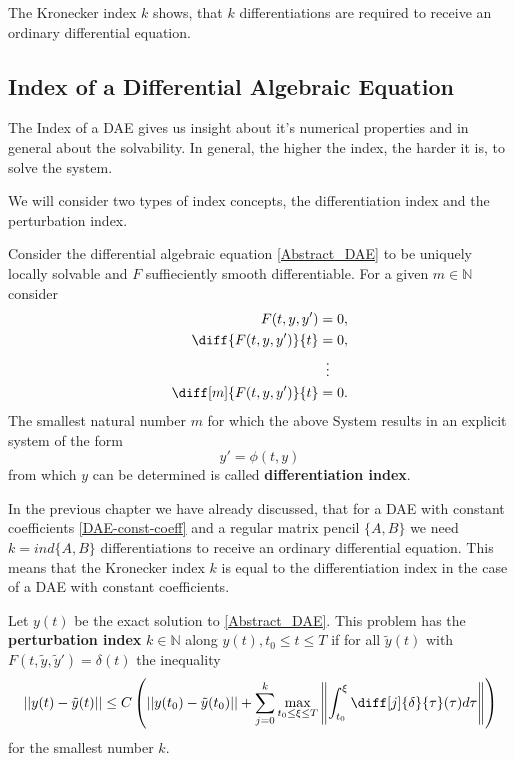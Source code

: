 The Kronecker index $k$ shows, that $k$ differentiations are required to receive an ordinary differential equation.

\subsection{Index of a Differential Algebraic Equation}

The Index of a DAE gives us insight about it's numerical properties and in general about the solvability. In general, the higher the index, the harder it is, to solve the system. 

We will consider two types of index concepts, the differentiation index and the perturbation index.

\begin{definition}
	Consider the differential algebraic equation \ref{Abstract_DAE} to be uniquely locally solvable and $F$ suffieciently smooth differentiable. For a given $m \in \mathbb{N}$ consider
	\begin{displaymath}
		\begin{aligned}
			F(t,y,y') &= 0, \\
			\diff{F(t,y,y')}{t} &= 0, \\
			&\vdotswithin{=} \\
			\diff[m]{F(t,y,y')}{t} &= 0.
		\end{aligned}
	\end{displaymath}
	The smallest natural number $m$ for which the above System results in an explicit system of the form
	\begin{displaymath}
		y' = \phi(t,y)
	\end{displaymath}
	from which $y$ can be determined is called \textbf{differentiation index}.
\end{definition}

In the previous chapter we have already discussed, that for a DAE with constant coefficients \ref{DAE-const-coeff} and a regular matrix pencil $\{A,B\}$  we need $k = ind\{A,B\}$ differentiations to receive an ordinary differential equation. This means that the Kronecker index $k$ is equal to the differentiation index in the case of a DAE with constant coefficients.

\begin{definition}
	Let $y(t)$ be the exact solution to \ref{Abstract_DAE}. This problem has the \textbf{perturbation index} $k \in \mathbb{N}$ along $y(t), t_0 \leq t \leq T$ if for all  $\tilde{y}(t)$ with $F(t, \tilde{y}, \tilde{y}') = \delta(t)$ the inequality
	\begin{displaymath}
		||y(t)-\tilde{y}(t)|| \leq C \left(||y(t_0)-\tilde{y}(t_0)||+\sum_{j=0}^{k}\max_{t_0 \leq \xi \leq T} \left\rVert 		\int_{t_0}^{\xi}\diff[j]{\delta}{\tau}(\tau)d \tau \right\rVert \right)
	\end{displaymath}
	for the smallest number $k$.
\end{definition}	

